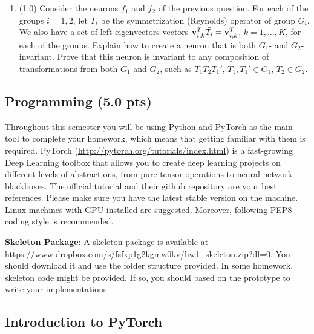 \documentclass{article}
\begin{document}
\begin{enumerate}
\newpage

\item (1.0) Consider the neurons $f_1$ and $f_2$ of the previous question. For each of the groups $i=1,2$, let $\bar{T}_i$ be the symmetrization (Reynolds) operator of group $G_i$. We also have a set of left eigenvectors vectors
${\bf v}_{i,k}^T \bar{T}_i = {\bf v}_{i,k}^T$, $k=1,\ldots,K$, for each of the groups. Explain how to create a neuron that is both $G_1$- and $G_2$-invariant. Prove that this neuron is invariant to any composition of transformations from both $G_1$ and $G_2$, such as $T_1 T_2 T_1'$, $T_1,T_1' \in G_1$, $T_2 \in G_2$.
%

\vspace{3in}



\end{enumerate}


\newpage
\subsection*{Programming (5.0 pts)}

Throughout this semester you will be using Python and PyTorch as the main tool
to complete your homework, which means that getting familiar with them is required.
PyTorch (\url{http://pytorch.org/tutorials/index.html}) is a fast-growing
Deep Learning toolbox that allows you to create deep learning projects on
different levels of abstractions, from pure tensor operations to neural network
blackboxes. The official tutorial and their github
repository are your best references. Please make sure you have the latest stable version on the machine.
Linux machines with GPU installed are suggested. Moreover, following PEP8 coding style is recommended.

\hfill

\noindent \textbf{Skeleton Package}: A skeleton package is available at\\
 \url{https://www.dropbox.com/s/fsfxp1g2kgmw0kv/hw1_skeleton.zip?dl=0}. You should download it and use the folder structure provided. In some homework, skeleton code might be provided. If so, you should based on the prototype to write your implementations.

\subsection*{Introduction to PyTorch}
\end{document}
